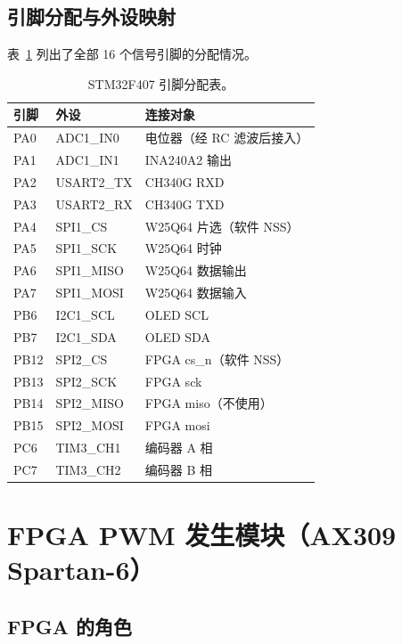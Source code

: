 \documentclass[12pt, a4paper]{ctexrep}
\begin{document}
\subsection{引脚分配与外设映射}

表~\ref{tab:pins} 列出了全部 16 个信号引脚的分配情况。

\begin{table}[H]
    \centering
    \caption{STM32F407 引脚分配表。}
    \label{tab:pins}
    \begin{tabular}{lll}
        \toprule
        \textbf{引脚} & \textbf{外设} & \textbf{连接对象} \\
        \midrule
        PA0  & ADC1\_IN0   & 电位器（经 RC 滤波后接入） \\
        PA1  & ADC1\_IN1   & INA240A2 输出 \\
        PA2  & USART2\_TX  & CH340G RXD \\
        PA3  & USART2\_RX  & CH340G TXD \\
        PA4  & SPI1\_CS    & W25Q64 片选（软件 NSS） \\
        PA5  & SPI1\_SCK   & W25Q64 时钟 \\
        PA6  & SPI1\_MISO  & W25Q64 数据输出 \\
        PA7  & SPI1\_MOSI  & W25Q64 数据输入 \\
        PB6  & I2C1\_SCL   & OLED SCL \\
        PB7  & I2C1\_SDA   & OLED SDA \\
        PB12 & SPI2\_CS    & FPGA cs\_n（软件 NSS） \\
        PB13 & SPI2\_SCK   & FPGA sck \\
        PB14 & SPI2\_MISO  & FPGA miso（不使用） \\
        PB15 & SPI2\_MOSI  & FPGA mosi \\
        PC6  & TIM3\_CH1   & 编码器 A 相 \\
        PC7  & TIM3\_CH2   & 编码器 B 相 \\
        \bottomrule
    \end{tabular}
\end{table}

\section{FPGA PWM 发生模块（AX309 Spartan-6）}

\subsection{FPGA 的角色}
\end{document}
